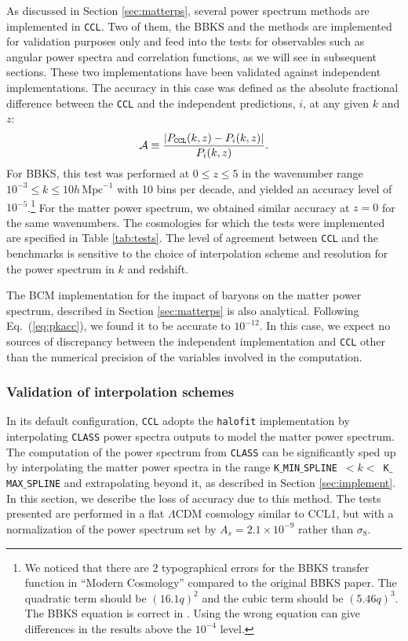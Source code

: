 \documentclass[\docopts]{\docclass}
\newcommand{\ccl}{{\tt CCL}\xspace}
\newcommand{\halofit}{{\tt halofit}\xspace}
\newcommand{\class}{{\tt CLASS}\xspace}
\begin{document}
As discussed in Section \ref{sec:matterps}, several power spectrum methods are implemented in \ccl. Two of them, the BBKS \citep{BBKS} and the \citet{1998ApJ...496..605E} methods are implemented for validation purposes only and feed into the tests for observables such as angular power spectra and correlation functions, as we will see in subsequent sections. These two implementations have been validated against independent implementations. The accuracy in this case was defined as the absolute fractional difference between the \ccl and the independent predictions, $i$, at any given $k$ and $z$:
\begin{equation}
  \mathcal{A}\equiv \frac{|P_{\tt CCL}(k,z)-P_{i}(k,z)|}{P_i(k,z)}.
  \label{eq:pkacc}
\end{equation}
For BBKS, this test was performed at $0\leq z \leq 5$ in the wavenumber range $10^{-3} \leq k \leq 10 h\,\text{Mpc}^{-1}$ with 10 bins per decade, and yielded an accuracy level of $10^{-5}$.\footnote{We noticed that there are 2 typographical errors for the BBKS transfer function in ``Modern Cosmology'' \citep{DodelsonBook} compared to the original BBKS paper. The quadratic term should be $(16.1q)^2$ and the cubic term should be $(5.46q)^3$. The BBKS equation is correct in \citet{PeacockBook}. Using the wrong equation can give differences in the results above the $10^{-4}$ level.}
For the \citet{1998ApJ...496..605E} matter power spectrum, we obtained similar accuracy at $z=0$ for the same wavenumbers. The cosmologies for which the tests were implemented are specified in Table \ref{tab:tests}. The level of agreement between \ccl and the benchmarks is sensitive to the choice of interpolation scheme and resolution for the power spectrum in $k$ and redshift.

The BCM implementation for the impact of baryons on the matter power spectrum, described in Section \ref{sec:matterps} is also analytical. Following Eq.~(\ref{eq:pkacc}), we found it to be accurate to $10^{-12}$. In this case, we expect no sources of discrepancy between the independent implementation and \ccl other than the numerical precision of the variables involved in the computation.

\subsubsection{Validation of interpolation schemes}
\label{ss:classval}

In its default configuration, \ccl adopts the \halofit \citep{CLASS_halofit} implementation by interpolating \class power spectra outputs to model the matter power spectrum. The computation of the power spectrum from \class can be significantly sped up by interpolating the matter power spectra in the range {\tt K$\_$MIN$\_$SPLINE}~$<k<$~{\tt K$\_$MAX$\_$SPLINE} and extrapolating beyond it, as described in Section \ref{sec:implement}. In this section, we describe the loss of accuracy due to this method. The tests presented are performed in a flat $\Lambda$CDM cosmology similar to CCL1, but with a normalization of the power spectrum set by $A_s=2.1\times10^{-9}$ rather than $\sigma_8$.
\end{document}
